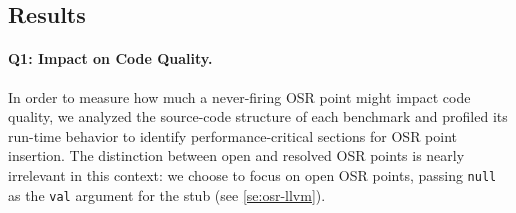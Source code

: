 \begin{description}
\subsection{Results}
\label{ss:experim-results}

\paragraph{Q1: Impact on Code Quality.}
In order to measure how much a never-firing OSR point might impact code quality, we analyzed the source-code structure of each benchmark and profiled its run-time behavior to identify performance-critical sections for OSR point insertion. The distinction between open and resolved OSR points is nearly irrelevant in this context: we choose to focus on open OSR points, passing {\tt null} as the {\tt val} argument for the stub (see \mysection\ref{se:osr-llvm}).


\end{description}
